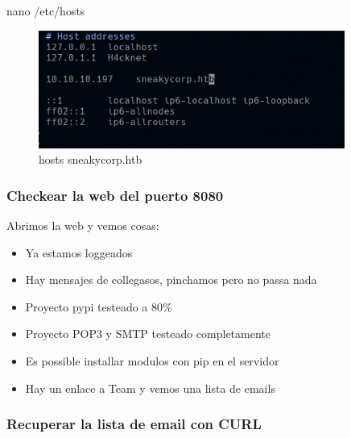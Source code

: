 \documentclass{assets/ipesethesis}
\newenvironment{Shaded}{\begin{snugshade}}{\end{snugshade}}
\newcommand{\FunctionTok}[1]{\textcolor[rgb]{0.00,0.00,0.00}{#1}}
\newcommand{\NormalTok}[1]{#1}
\providecommand{\tightlist}{%
  \setlength{\itemsep}{0pt}\setlength{\parskip}{0pt}}
\begin{document}
\begin{Shaded}
\begin{Highlighting}[]
\FunctionTok{nano}\NormalTok{ /etc/hosts}
\end{Highlighting}
\end{Shaded}

\begin{figure}
\includegraphics[width=0.9\linewidth]{images/hosts-sneakycorp} \caption{hosts sneakycorp.htb}\label{fig:unnamed-chunk-9}
\end{figure}

\hypertarget{checkear-la-web-del-puerto-8080}{%
\subsubsection*{Checkear la web del puerto 8080}\label{checkear-la-web-del-puerto-8080}}

Abrimos la web y vemos cosas:

\begin{itemize}
\tightlist
\item
  Ya estamos loggeados
\item
  Hay mensajes de collegasos, pinchamos pero no passa nada
\item
  Proyecto pypi testeado a 80\%
\item
  Proyecto POP3 y SMTP testeado completamente
\item
  Es possible installar modulos con pip en el servidor
\item
  Hay un enlace a Team y vemos una lista de emails
\end{itemize}

\hypertarget{recuperar-la-lista-de-email-con-curl}{%
\subsubsection*{Recuperar la lista de email con CURL}\label{recuperar-la-lista-de-email-con-curl}}
\end{document}

